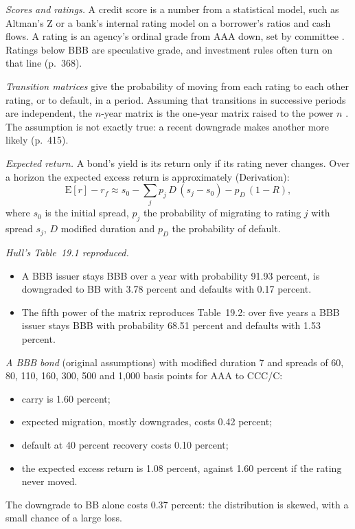 \begin{qfmethod}\label{meth:rating-migration-returns}
 \emph{Scores and ratings.} A credit score is a number from a statistical model, such as Altman's Z or a bank's internal rating model on a borrower's ratios and cash flows. A rating is an agency's ordinal grade from AAA down, set by committee \citep[pp.~367--369]{risk-management-financial-institutions-2023}. Ratings below BBB are speculative grade, and investment rules often turn on that line (p.~368).

\emph{Transition matrices} give the probability of moving from each rating to each other rating, or to default, in a period. Assuming that transitions in successive periods are independent, the $n$-year matrix is the one-year matrix raised to the power $n$ \citep[pp.~414--415]{risk-management-financial-institutions-2023}. The assumption is not exactly true: a recent downgrade makes another more likely (p.~415).

\emph{Expected return.} A bond's yield is its return only if its rating never changes. Over a horizon the expected excess return is approximately (Derivation):
\[ \mathrm{E}[r]-r_f\approx s_0-\sum_j p_j\,D\,(s_j-s_0)-p_D\,(1-R), \]
where $s_0$ is the initial spread, $p_j$ the probability of migrating to rating $j$ with spread $s_j$, $D$ modified duration and $p_D$ the probability of default.

 \emph{Hull's Table~19.1 reproduced.}
\begin{itemize}
\item A BBB issuer stays BBB over a year with probability 91.93 percent, is downgraded to BB with 3.78 percent and defaults with 0.17 percent.
\item The fifth power of the matrix reproduces Table~19.2: over five years a BBB issuer stays BBB with probability 68.51 percent and defaults with 1.53 percent.
\end{itemize}

\emph{A BBB bond} (original assumptions) with modified duration 7 and spreads of 60, 80, 110, 160, 300, 500 and 1,000 basis points for AAA to CCC/C:
\begin{itemize}
\item carry is 1.60 percent;
\item expected migration, mostly downgrades, costs 0.42 percent;
\item default at 40 percent recovery costs 0.10 percent;
\item the expected excess return is 1.08 percent, against 1.60 percent if the rating never moved.
\end{itemize}
The downgrade to BB alone costs 0.37 percent: the distribution is skewed, with a small chance of a large loss.


\end{qfmethod}
